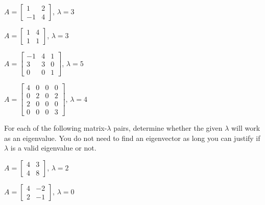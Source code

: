 \ba
\begin{minipage}{2.0in} 
\item $A=\left[ \begin{array}{rc} 1&2 \\ -1&4 \end{array} \right]$, $\lambda=3$
\end{minipage}
\begin{minipage}{2.0in} 
\item $A=\left[ \begin{array}{cc} 1&4 \\ 1&1 \end{array} \right]$, $\lambda=3$
\end{minipage}

\begin{minipage}{2.0in} 
\item $A=\left[ \begin{array}{rcc} -1&4&1 \\ 3&3&0 \\ 0&0&1 \end{array} \right]$, $\lambda=5$
\end{minipage}
\begin{minipage}{2.0in} 
\item $A=\left[ \begin{array}{cccc} 4&0&0&0 \\ 0&2&0&2 \\ 2&0&0&0 \\ 0&0&0&3 \end{array} \right]$, $\lambda=4$
\end{minipage}

\ea

\item For each of the following matrix-$\lambda$ pairs, determine whether the given $\lambda$ will work as an eigenvalue. You do not need to find an eigenvector as long you can justify if $\lambda$ is a valid eigenvalue or not.

\ba
\begin{minipage}{2.0in} 
\item $A=\left[ \begin{array}{cc} 4&3 \\ 4&8 \end{array} \right]$, $\lambda=2$
\end{minipage}
\begin{minipage}{2.0in} 
\item $A=\left[ \begin{array}{cr} 4&-2 \\ 2&-1 \end{array} \right]$, $\lambda=0$
\end{minipage}

